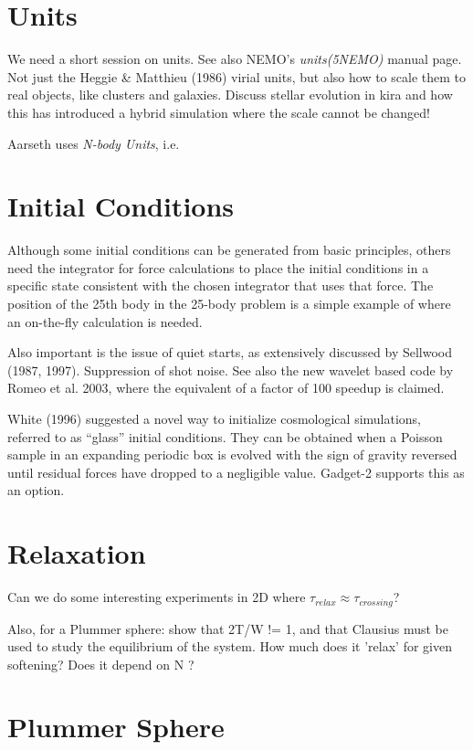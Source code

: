 \begin{itemize}
\begin{itemize}
\section{Units}

We need a short session on units. See also NEMO's {\it units(5NEMO)} manual page.
Not just the Heggie \& Matthieu (1986) virial units, but also how to scale them to
real objects, like clusters and galaxies. Discuss stellar evolution in kira
and how this has introduced a hybrid simulation where the scale cannot be
changed!

Aarseth uses {\it N-body Units}, i.e.

\section{Initial Conditions}

Although some initial conditions can be generated from basic principles,
others need the
integrator for force calculations to place the initial conditions in a
specific state consistent with the chosen integrator that uses that force. 
The position of the 25th
body in the 25-body problem is a simple 
example of where an on-the-fly calculation
is needed.

Also important is the issue of quiet starts, as extensively
discussed by Sellwood (1987, 1997). Suppression of shot noise.
See also the new wavelet based code by Romeo et al. 2003, where the
equivalent of a factor of 100 speedup is claimed.

White (1996) suggested a novel way to initialize cosmological simulations,
referred to as ``glass'' initial conditions. They can be obtained when
a Poisson sample in an expanding periodic box is evolved with the
sign of gravity reversed until residual forces have dropped to a negligible
value. Gadget-2 supports this as an option.


\section{Relaxation}

Can we do some interesting experiments in 2D where $\tau_{relax} \approx \tau_{crossing}$?


Also, for a Plummer sphere: show that 2T/W != 1, and that Clausius must be used to study
the equilibrium of the system. How much does it 'relax' for given softening?
Does it depend on N ?


\section{Plummer Sphere}


\end{itemize}
\end{itemize}
